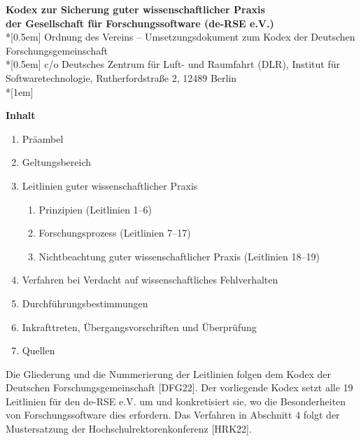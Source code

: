 \documentclass[a4paper, fontsize=11pt]{scrartcl}
\begin{document}
\thispagestyle{headings}
\vspace{-8.5cm}
\begin{centering}
{\large\textbf{Kodex zur Sicherung guter wissenschaftlicher Praxis\\ der Gesellschaft für Forschungssoftware (de-RSE e.V.)}}\\*[0.5em]
{\small Ordnung des Vereins -- Umsetzungsdokument zum Kodex der Deutschen Forschungsgemeinschaft}\\*[0.5em]
{\tiny c/o Deutsches Zentrum für Luft- und Raumfahrt (DLR), Institut für Softwaretechnologie, Rutherfordstraße 2, 12489 Berlin}\\*[1em]
\end{centering}
\vspace{0.3cm}

{\large\textbf{Inhalt}} \\
\begin{enumerate}
    \item Präambel
    \item Geltungsbereich
    \item Leitlinien guter wissenschaftlicher Praxis
    \begin{enumerate}
        \item Prinzipien (Leitlinien 1--6)
        \item Forschungsprozess (Leitlinien 7--17)
        \item Nichtbeachtung guter wissenschaftlicher Praxis (Leitlinien 18--19)
    \end{enumerate}
    \item Verfahren bei Verdacht auf wissenschaftliches Fehlverhalten
    \item Durchführungsbestimmungen
    \item Inkrafttreten, Übergangsvorschriften und Überprüfung
    \item Quellen
\end{enumerate}

\vspace{0.3cm}
\noindent\small Die Gliederung und die Nummerierung der Leitlinien folgen dem Kodex der Deutschen Forschungsgemeinschaft [DFG22]. Der vorliegende Kodex setzt alle 19 Leitlinien für den de-RSE e.V. um und konkretisiert sie, wo die Besonderheiten von Forschungssoftware dies erfordern. Das Verfahren in Abschnitt 4 folgt der Mustersatzung der Hochschulrektorenkonferenz [HRK22].\normalsize

\vspace{0.5cm}
\end{document}
